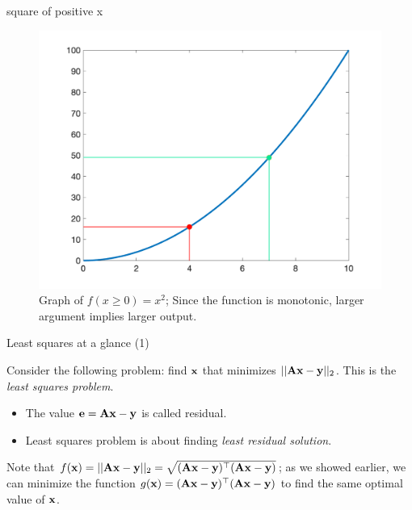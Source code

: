 \documentclass{beamer}
\begin{document}
\begin{frame}{square of positive x}
	\begin{flushleft}
		
		\begin{figure}
			\centering
			\includegraphics[width=0.85\linewidth]{example_sqrt}
			\caption{Graph of $f(x\geq 0) = x^2$; Since the function is monotonic, larger argument implies larger output.}
		\end{figure}
		
		
	\end{flushleft}
\end{frame}



\begin{frame}{Least squares at a glance (1)}
	\begin{flushleft}
		
		Consider the following problem: find $\mathbf{x}$ that minimizes $|| \mathbf{A}\mathbf{x} - \mathbf{y} ||_2$. This is the \emph{least squares problem}. 
		
		\bigskip
		
		\begin{itemize}
			\item The value $\mathbf{e} = \mathbf{A}\mathbf{x} - \mathbf{y}$ is called residual.
			
			\item Least squares problem is about finding \emph{least residual solution}.
		\end{itemize}
		
		Note that $f(\mathbf{x}) = || \mathbf{A}\mathbf{x} - \mathbf{y} ||_2 = \sqrt{(\mathbf{A}\mathbf{x} - \mathbf{y})^\top(\mathbf{A}\mathbf{x} - \mathbf{y})}$; as we showed earlier, we can minimize the function $g(\mathbf{x}) = (\mathbf{A}\mathbf{x} - \mathbf{y})^\top(\mathbf{A}\mathbf{x} - \mathbf{y})$ to find the same optimal value of $\mathbf{x}$.
		
		
	\end{flushleft}
\end{frame}
\end{document}
